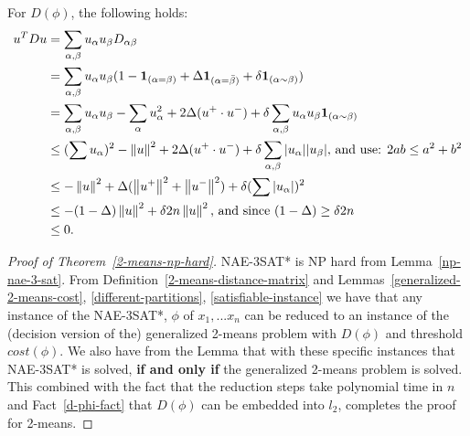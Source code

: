 \begin{fact} \label{d-phi-fact}
For $D(\phi)$, the following holds:
\begin{align*}
u^TDu &= \sum_{\alpha, \beta} u_\alpha u_\beta D_{\alpha \beta}\\ 
&=\sum_{\alpha, \beta} u_\alpha u_\beta (1 - \mathbf{1}_{(\alpha =
  \beta)} + \Delta\mathbf{1}_{(\alpha = \bar{\beta})} + \delta
\mathbf{1}_{(\alpha \sim \beta)})\\ 
&=\sum_{\alpha, \beta} u_\alpha u_\beta - \sum_{\alpha} u_\alpha^2
+2\Delta (u^+ \cdot u^-) + \delta \sum_{\alpha, \beta} u_\alpha
u_\beta \mathbf{1}_{(\alpha \sim \beta)}\\ 
& \le (\sum u_\alpha)^2  - \left\lVert u\right\rVert^2 + 2\Delta (u^+ \cdot u^-) +
\delta \sum_{\alpha, \beta} |u_\alpha| |u_\beta| \textrm{,  and use: }
  2ab \le a^2 + b^2\\  
& \le - \left\lVert u\right\rVert^2 + \Delta (\left\lVert u^+\right\rVert^2  + \left\lVert u^-\right\rVert^2) + \delta
(\sum |u_\alpha|)^2 \\ 
& \le -(1- \Delta) \left\lVert u\right\rVert^2  + \delta 2n \left\lVert u\right\rVert^2 \textrm{,  and
    since } (1- \Delta) \ge \delta 2n \\ 
& \le 0.
\end{align*}
\end{fact}


\begin{proof}[Proof of Theorem~\ref{2-means-np-hard}]
NAE-3SAT* is NP hard from Lemma~\ref{np-nae-3-sat}.  From
Definition~\ref{2-means-distance-matrix} and
Lemmas~\ref{generalized-2-means-cost}, \ref{different-partitions},
\ref{satisfiable-instance} we have that any instance of the NAE-3SAT*,
$\phi$ of $x_1,...x_n$ can be reduced to an instance of the (decision
version of the) generalized 2-means problem with $D(\phi)$ and
threshold $cost(\phi)$.  We also have from the Lemma that with these
specific instances that NAE-3SAT* is solved, \textbf{if and only if}
the generalized 2-means problem is solved.  This combined with the
fact that the reduction steps take polynomial time in $n$ and
Fact~\ref{d-phi-fact} that $D(\phi)$ can be embedded into $l_2$,
completes the proof for 2-means. 
\end{proof}
